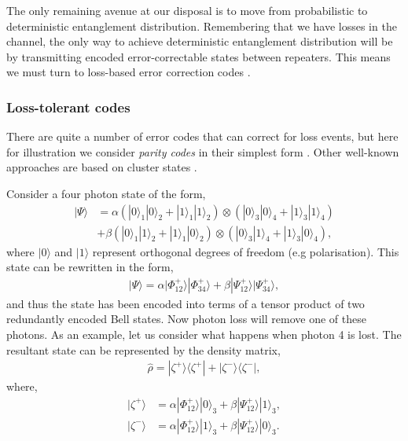 The only remaining avenue at our disposal is to move from probabilistic to deterministic entanglement distribution. Remembering that we have losses in the channel, the only way to achieve deterministic entanglement distribution will be by transmitting encoded error-correctable states between repeaters. This means we must turn to loss-based error correction codes \cite{bib:ralph05, bib:munro12, bib:Fowler10, bib:ATL13, bib:MKLLJ14}.  

\subsubsection{Loss-tolerant codes}

There are quite a number of error codes that can correct for loss events, but here for illustration we consider \textit{parity codes} in their simplest form \cite{bib:ralph05, bib:munro12}. Other well-known approaches are based on cluster states \cite{?RudolphHorticulture}.

Consider a four photon state of the form,
\begin{align}
|\Psi\rangle &= \alpha \left(|0\rangle_1 |0\rangle_2+|1\rangle_1 |1\rangle_2\right) \otimes \left(|0\rangle_3 |0\rangle_4+|1\rangle_3 |1\rangle_4\right) \nonumber \\
&+ \beta \left(|0\rangle_1 |1\rangle_2+|1\rangle_1 |0\rangle_2\right) \otimes \left(|0\rangle_3 |1\rangle_4+|1\rangle_3 |0\rangle_4\right),
\end{align}
where $|0\rangle$ and $|1\rangle$ represent orthogonal degrees of freedom (e.g polarisation). This state can be rewritten in the form,
\begin{align}\label{eq:third_gen_red_enc}
|\Psi\rangle = \alpha |\Phi_{12}^+\rangle  |\Phi_{34}^+\rangle+\beta |\Psi_{12}^+\rangle  |\Psi_{34}^+\rangle,
\end{align}
and thus the state has been encoded into terms of a tensor product of two redundantly encoded Bell states. Now photon loss will remove one of these photons. As an example, let us consider what happens when photon 4 is lost. The resultant state can be represented by the density matrix,
\begin{align}
	\hat\rho= |\zeta^+\rangle \langle \zeta^+| +|\zeta^-\rangle \langle \zeta^-|,
	\end{align}
where,
\begin{align}
|\zeta^+\rangle &=  \alpha |\Phi_{12}^+\rangle |0\rangle_3 + \beta  |\Psi_{12}^+\rangle |1\rangle_3, \nonumber \\
|\zeta^-\rangle &=  \alpha |\Phi_{12}^+\rangle |1\rangle_3 + \beta  |\Psi_{12}^+\rangle |0\rangle_3.
\end{align}

